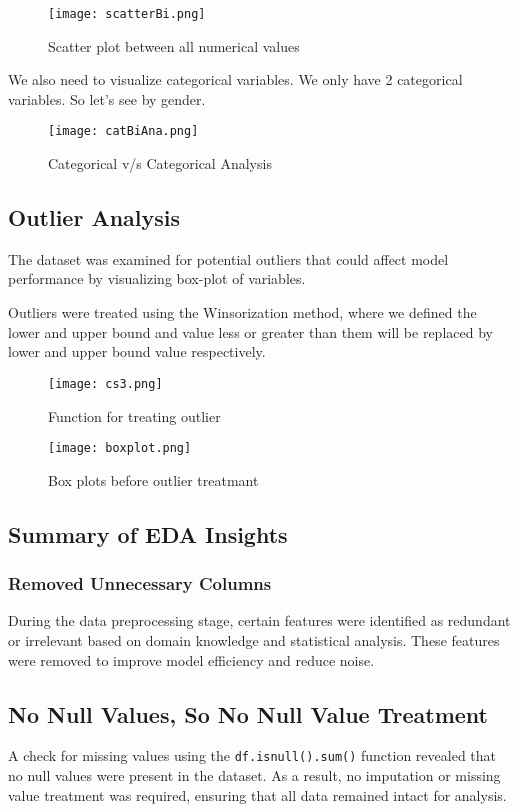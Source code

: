 \documentclass[12pt]{article}
\begin{document}
\begin{figure}[H]
    \centering
    \texttt{[image: scatterBi.png]}
    \caption{Scatter plot between all numerical values}
    \label{fig:example}
\end{figure}

We also need to visualize categorical variables. We only have 2 categorical variables. So let's see by gender.

\begin{figure}[H]
    \centering
    \texttt{[image: catBiAna.png]}
    \caption{Categorical v/s Categorical Analysis}
    \label{fig:example}
\end{figure}

\subsection{Outlier Analysis}
The dataset was examined for potential outliers that could affect model performance by visualizing box-plot of variables.

Outliers were treated using the Winsorization method, where we defined the lower and upper bound and value less or greater than them will be replaced by lower and upper bound value respectively. 
\begin{figure}[H]
    \centering
    \texttt{[image: cs3.png]}
    \caption{Function for treating outlier}
    \label{fig:example}
\end{figure}

\begin{figure}[H]
    \centering
    \texttt{[image: boxplot.png]}
    \caption{Box plots before outlier treatmant }
    \label{fig:example}
\end{figure}

\subsection{Summary of EDA Insights}

\subsubsection{Removed Unnecessary Columns}
During the data preprocessing stage, certain features were identified as redundant or irrelevant based on domain knowledge and statistical analysis. These features were removed to improve model efficiency and reduce noise.

\subsection{No Null Values, So No Null Value Treatment}
A check for missing values using the \texttt{df.isnull().sum()} function revealed that no null values were present in the dataset. As a result, no imputation or missing value treatment was required, ensuring that all data remained intact for analysis.
\end{document}
